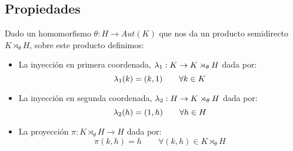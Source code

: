 \subsection{Propiedades}
\begin{definicion}
    Dado un homomorfismo $\theta:H\to Aut(K)$ que nos da un producto semidirecto $K\rtimes_\theta H$, sobre este producto definimos:
    \begin{itemize}
        \item La inyección en primera coordenada, $\lambda_1:K\to K\rtimes_\theta H$ dada por:
            \begin{equation*}
                \lambda_1(k) = (k,1) \qquad \forall k\in K
            \end{equation*}
        \item La inyección en segunda coordenada, $\lambda_2:H\to K\rtimes_\theta H$ dada por:
            \begin{equation*}
                \lambda_2(h) = (1,h) \qquad \forall h\in H
            \end{equation*}
        \item La proyección $\pi:K\rtimes_\theta H \to H$ dada por:
            \begin{equation*}
                \pi(k,h) = h \qquad \forall (k,h)\in K\rtimes_\theta H
            \end{equation*}
    \end{itemize}
    \begin{figure}[H]
        \centering
    \end{figure}
\end{definicion}

